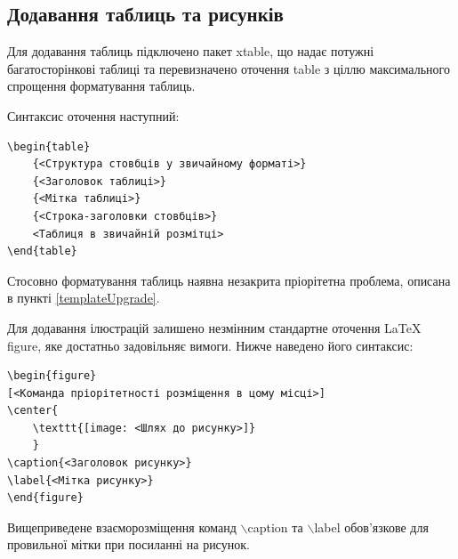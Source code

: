 \subsection{Додавання таблиць та рисунків}

Для додавання таблиць підключено пакет xtable, що надає потужні багатосторінкові таблиці та перевизначено оточення table з ціллю максимального спрощення форматування таблиць.

Синтаксис оточення наступний:
\begin{verbatim}
\begin{table}
	{<Структура стовбців у звичайному форматі>}
	{<Заголовок таблиці>}
	{<Мітка таблиці>}
	{<Строка-заголовки стовбців>}
	<Таблиця в звичайній розмітці>
\end{table}
\end{verbatim}

Стосовно форматування таблиць наявна незакрита пріорітетна проблема, описана в пункті \ref{templateUpgrade}.

Для додавання ілюстрацій залишено незмінним стандартне оточення \LaTeX{} figure, яке достатньо задовільняє вимоги. Нижче наведено його синтаксис:
\begin{verbatim}
\begin{figure}
[<Команда пріорітетності розміщення в цому місці>]
\center{
	\texttt{[image: <Шлях до рисунку>]}
	}
\caption{<Заголовок рисунку>}
\label{<Мітка рисунку>}
\end{figure}
\end{verbatim}

Вищеприведене взаєморозміщення команд $\backslash$caption та $\backslash$label обов'язкове для провильної мітки при посиланні на рисунок.
